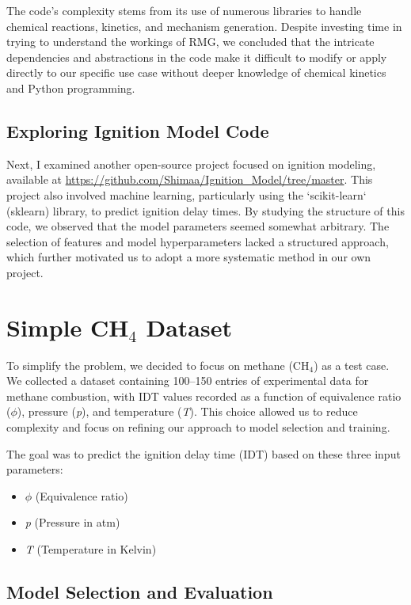 \documentclass[12pt]{report}
\begin{document}
The code's complexity stems from its use of numerous libraries to handle chemical reactions, kinetics, and mechanism generation. Despite investing time in trying to understand the workings of RMG, we concluded that the intricate dependencies and abstractions in the code make it difficult to modify or apply directly to our specific use case without deeper knowledge of chemical kinetics and Python programming.

\subsection{Exploring Ignition Model Code}

Next, I examined another open-source project focused on ignition modeling, available at \url{https://github.com/Shimaa/Ignition_Model/tree/master}. This project also involved machine learning, particularly using the `scikit-learn` (sklearn) library, to predict ignition delay times. By studying the structure of this code, we observed that the model parameters seemed somewhat arbitrary. The selection of features and model hyperparameters lacked a structured approach, which further motivated us to adopt a more systematic method in our own project.

\section{Simple CH\(_4\) Dataset}

To simplify the problem, we decided to focus on methane (CH\(_4\)) as a test case. We collected a dataset containing 100–150 entries of experimental data for methane combustion, with IDT values recorded as a function of equivalence ratio (\(\phi\)), pressure (\textit{p}), and temperature (\textit{T}). This choice allowed us to reduce complexity and focus on refining our approach to model selection and training.

The goal was to predict the ignition delay time (IDT) based on these three input parameters: 
\begin{itemize}
    \item \(\phi\) (Equivalence ratio)
    \item \textit{p} (Pressure in atm)
    \item \textit{T} (Temperature in Kelvin)
\end{itemize}

\subsection{Model Selection and Evaluation}
\end{document}

